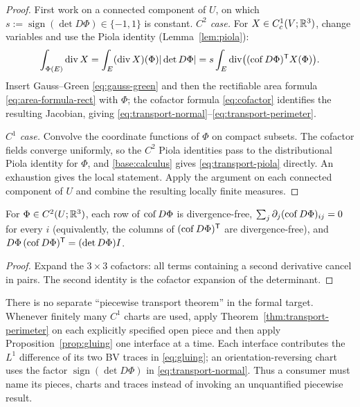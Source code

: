\begin{proof}
First work on a connected component of $U$, on which
$s:=\operatorname{sign}(\det D\Phi)\in\{-1,1\}$ is constant.
\emph{$C^2$ case.} For $X\in C^1_c(V;\mathbb R^3)$, change variables and use the
Piola identity (Lemma~\ref{lem:piola}):
\begin{equation}\label{eq:transport-piola}
  \int_{\Phi(E)}\operatorname{div} X
  =\int_E(\operatorname{div} X)(\Phi)|\det D\Phi|
  =s\int_E\operatorname{div}\bigl((\operatorname{cof} D\Phi)^{\mathsf T}X(\Phi)\bigr).
\end{equation}
Insert Gauss--Green \eqref{eq:gauss-green} and then the rectifiable area
formula \eqref{eq:area-formula-rect} with $\Phi$; the cofactor formula
\eqref{eq:cofactor} identifies the resulting Jacobian, giving
\eqref{eq:transport-normal}--\eqref{eq:transport-perimeter}.

\emph{$C^1$ case.} Convolve the coordinate functions of $\Phi$ on compact
subsets.  The cofactor fields converge uniformly, so the $C^2$ Piola
identities pass to the distributional Piola identity for $\Phi$, and
\ref{base:calculus} gives \eqref{eq:transport-piola} directly.  An exhaustion
gives the local statement.  Apply the argument on each connected component
of $U$ and combine the resulting locally finite measures.
\end{proof}

\begin{lemma}\label{lem:piola}
For $\Phi\in C^2(U;\mathbb R^3)$, each row of $\operatorname{cof} D\Phi$ is divergence-free,
$\sum_j\partial_j(\operatorname{cof} D\Phi)_{ij}=0$ for every $i$ (equivalently, the columns of
$(\operatorname{cof} D\Phi)^{\mathsf T}$ are divergence-free), and
$D\Phi\,(\operatorname{cof} D\Phi)^{\mathsf T}=(\det D\Phi)I$.
\end{lemma}

\begin{proof}
Expand the $3\times3$ cofactors: all terms containing a second derivative
cancel in pairs.  The second identity is the cofactor expansion of the
determinant.
\end{proof}

\begin{fnote}\label{fnote:transport-piecewise}
There is no separate ``piecewise transport theorem'' in the formal target.
Whenever finitely many $C^1$ charts are used, apply
Theorem~\ref{thm:transport-perimeter} on each explicitly specified open
piece and then apply Proposition~\ref{prop:gluing} one interface at a time.
Each interface contributes the $L^1$ difference of its two BV traces in
\eqref{eq:gluing}; an orientation-reversing chart uses the factor
$\operatorname{sign}(\det D\Phi)$ in \eqref{eq:transport-normal}.  Thus a
consumer must name its pieces, charts and traces instead of invoking an
unquantified piecewise result.
\end{fnote}

